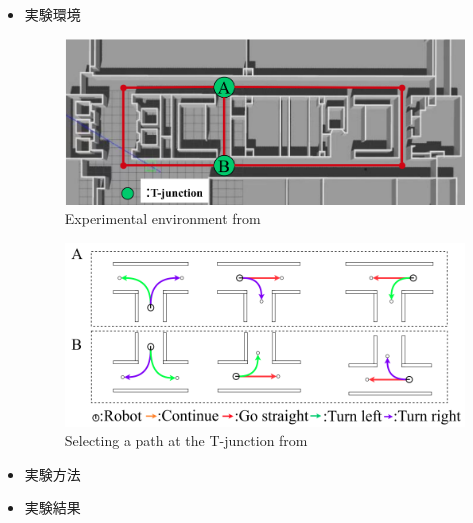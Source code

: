 \begin{itemize}
  \item 実験環境

  \begin{figure}[hbtp]
  \centering
 \includegraphics[keepaspectratio, scale=0.35]
      {images/tsudanuma2-3_sim.png}
 \caption{Experimental environment from \cite{mech}}
 \label{Fig:tsudanuma2-3_sim}
\end{figure}

\begin{figure}[hbtp]
  \centering
 \includegraphics[keepaspectratio, scale=0.35]
      {images/select_patarn.png}
 \caption{Selecting a path at the T-junction from \cite{mech}}
 \label{Fig:select_patarn}
\end{figure}

  \item 実験方法
  \item 実験結果
\end{itemize}


